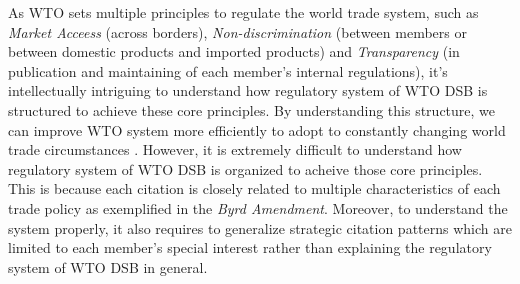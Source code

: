 As WTO sets multiple principles to regulate the world trade system, 
such as \textit{Market Acceess} (across borders), 
\textit{Non-discrimination} (between members 
or between domestic products and imported products) 
and \textit{Transparency} (in publication and maintaining 
of each member's internal regulations), 
it's intellectually intriguing 
to understand how regulatory system of WTO DSB
is structured to achieve these core principles.
By understanding this structure, 
we can improve WTO system more efficiently 
to adopt to constantly 
changing world trade circumstances
\citep{FREDEBEULKREIN1999625, shaffer_2004, 10.1093/jiel/jgm028}.
However, it is extremely difficult to 
understand how regulatory system of 
WTO DSB is organized to acheive 
those core principles. 
This is because each citation is closely related 
to multiple characteristics 
of each trade policy as exemplified in 
the \textit{Byrd Amendment}. 
Moreover, to understand the system properly, 
it also requires to generalize strategic 
citation patterns which are limited 
to each member's special interest 
rather than explaining the 
regulatory system of WTO DSB in general.


